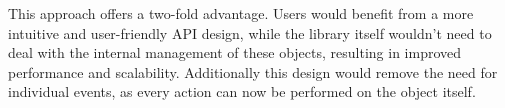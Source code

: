 This approach offers a two-fold advantage. Users would benefit from a more intuitive and user-friendly API design, while the library
itself wouldn't need to deal with the internal management of these objects, resulting in improved performance and scalability.
Additionally this design would remove the need for individual events, as every action can now be performed on the object itself.
